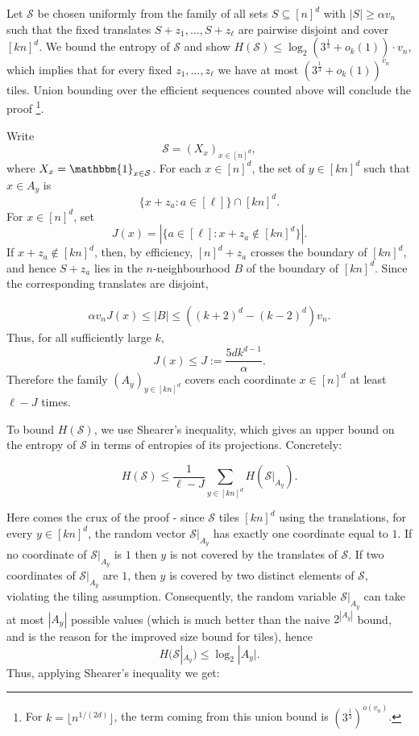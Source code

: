 \documentclass{article}
\begin{document}
Let \(\mathcal S\) be chosen uniformly from the family of all sets \(S\subseteq[n]^d\) with \(|S|\ge\alpha v_n\) such that the fixed translates \(S+z_1,\ldots,S+z_\ell\) are pairwise disjoint and cover \([kn]^d\). We bound the entropy of \(\mathcal S\) and show \(H(\mathcal S) \leq \log_2 \left( 3^{\frac{1}{3}}+ o_{k}(1) \right) \cdot v_n \), which implies that for every fixed \(z_1,\ldots,z_\ell\) we have at most \(\left(3^{\frac{1}{3}}+o_{k}(1)\right)^{v_n}\) tiles. Union bounding over the efficient sequences counted above will conclude the proof \footnote{For $k=\lfloor n^{1/(2d)}\rfloor$, the term coming from this union bound is $(3^{\frac{1}{3}})^{o(v_n)}$.}.

Write
\[
    \mathcal S=(X_x)_{x\in[n]^d},
\]
where \(X_x=\mathbbm{1}_{x\in\mathcal S}\). For each \(x\in[n]^d\), the set of \(y\in[kn]^d\) such that \(x\in A_y\) is
\[
    \{x+z_a:a\in[\ell]\}\cap[kn]^d.
\]
\noindent
For \(x\in[n]^d\), set
\[
    J(x)=|\{a\in[\ell]:x+z_a\notin[kn]^d\}|.
\]
If \(x+z_a\notin[kn]^d\), then, by efficiency, \([n]^d+z_a\) crosses the boundary of \([kn]^d\), and hence \(S+z_a\) lies in the \(n\)-neighbourhood \(B\) of the boundary of \([kn]^d\). Since the corresponding translates are disjoint,

\begin{align}\label{eq - vol packing}
    \alpha v_n J(x)\le |B|
       \le ((k+2)^d-(k-2)^d)v_n.
\end{align}
Thus, for all sufficiently large \(k\),
\[
    J(x)\le J:=\frac{5dk^{d-1}}{\alpha}.
\]
Therefore the family \((A_y)_{y\in[kn]^d}\) covers each coordinate \(x\in[n]^d\) at least \(\ell-J\) times.

To bound \(H(\mathcal S)\), we use Shearer's inequality, which gives an upper bound on the entropy of \(\mathcal S\) in terms of entropies of its projections. Concretely:

\[ H(\mathcal S)\leq \frac{1}{\ell-J} \sum_{y\in[kn]^d} H(\mathcal S|_{A_y}) .\]


\noindent Here comes the crux of the proof - since $\mathcal{S}$ tiles $[kn]^d$ using the translations, for every \(y\in[kn]^d\), the random vector \(\mathcal S|_{A_y}\) has exactly one coordinate equal to \(1\). If no coordinate of \(\mathcal S|_{A_y}\) is $1$ then $y$ is not covered by the translates of $\mathcal{S}$. If two coordinates of \(\mathcal S|_{A_y}\) are $1$, then $y$ is covered by two distinct elements of $\mathcal{S}$, violating the tiling assumption. Consequently, the random variable \(\mathcal S|_{A_y}\) can take at most \(|A_y|\) possible values (which is much better than the naive $2^{|A_y|}$ bound, and is the reason for the improved size bound for tiles), hence
\[
    H(\mathcal S|_{A_y})\le \log_2 |A_y|.
\]
Thus, applying Shearer's inequality we get:
\end{document}
